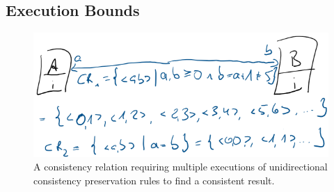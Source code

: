 

\subsection{Execution Bounds} %
\label{chap:synchronization:combination:bounds}

\begin{figure}
    \centering
    \includegraphics[width=\textwidth]{figures/correctness/synchronization/multiple_unidirectional_execution.png}
    \caption[Multiple execution of consistency preservation rules]{A consistency relation requiring multiple executions of unidirectional consistency preservation rules to find a consistent result.}
    \label{fig:synchronization:multiple_unidirectional_execution}
\end{figure}

